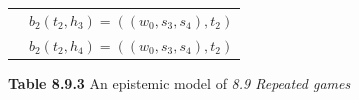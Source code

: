 \documentclass{article}
\begin{document}
\begin{description}
\begin{center}
\begin{tabular}{cl}
        \multicolumn{ 1}{c}{{\bf }} &         $b_2\left(t_2,h_3\right)=\left(\left(w_0,s_3,s_4\right),t_2\right)$ \\

        \multicolumn{ 1}{c}{{\bf }} &         $b_2\left(t_2,h_4\right)=\left(\left(w_0,s_3,s_4\right),t_2\right)$ \\
        \hline
        \hline
        \end{tabular}

        {\bf Table 8.9.3} An epistemic model of {\it 8.9 Repeated games}
    \end{center}
\end{description}
\end{document}
